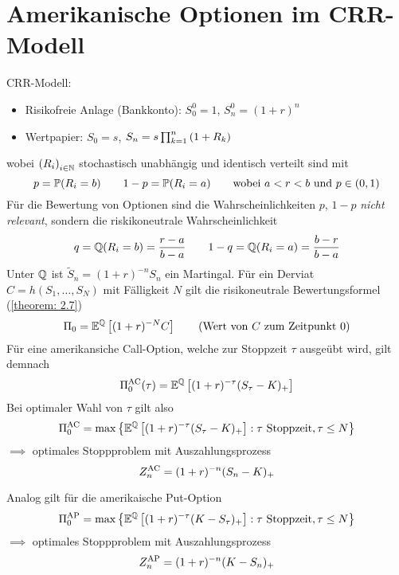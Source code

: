 \section{Amerikanische Optionen im CRR-Modell}

CRR-Modell:
\begin{itemize}
	\item Risikofreie Anlage (Bankkonto): $S_0^0 = 1$, $S_n^0 = (1+r)^n$
	\item Wertpapier:  $S_0 = s$, $S_n = s \prod_{k=1}^{n} \left( 1 + R_k \right)$
\end{itemize}
wobei $\left( R_i \right)_{i \in \mathbb{N}}$ stochastisch unabhängig und identisch verteilt sind mit
\begin{equation*}
	p = \mathbb{P}(R_i = b) \qquad 1-p = \mathbb{P}(R_i = a) \qquad \text{wobei } a < r < b \text{ und } p \in (0,1)
\end{equation*}
Für die Bewertung von Optionen sind die Wahrscheinlichkeiten $p$, $1-p$ \textit{nicht relevant}, sondern die riskikoneutrale Wahrscheinlichkeit 
\begin{equation*}
	q = \mathbb{Q}(R_i = b) = \frac{r-a}{b-a} \qquad 1-q = \mathbb{Q}(R_i = a) = \frac{b-r}{b-a}
\end{equation*}
Unter $\mathbb{Q}$ ist $\tilde{S}_n = (1+r)^{-n} S_n$ ein Martingal.
Für ein Derviat $C = h(S_1, \dots, S_N)$ mit Fälligkeit $N$ gilt die risikoneutrale Bewertungsformel (\cref{theorem: 2.7})
\begin{equation*}
	\Pi_0 = \mathbb{E}^{\mathbb{Q}}\left[ (1+r)^{-N} C \right]
	\tag{Wert von $C$ zum Zeitpunkt $0$}
\end{equation*}
Für eine amerikansiche Call-Option, welche zur Stoppzeit $\tau$ ausgeübt wird, gilt demnach
\begin{equation*}
	\Pi_0^{\operatorname{AC}}(\tau) = \mathbb{E}^{\mathbb{Q}} \left[ (1+r)^{-\tau} (S_\tau - K)_+ \right]
\end{equation*}
Bei optimaler Wahl von $\tau$ gilt also
\begin{equation*}
	\Pi_0^{\operatorname{AC}} = \max\left\{ \mathbb{E}^{\mathbb{Q}}\left[ (1+r)^{-\tau} (S_\tau - K)_+ \right] : \tau \text{ Stoppzeit}, \tau \le N \right\}
\end{equation*}
$\implies$ optimales Stoppproblem mit Auszahlungsprozess
\begin{equation*}
	Z_n^{\operatorname{AC}} = (1+r)^{-n} (S_n - K)_+
\end{equation*}

Analog gilt für die amerikaische Put-Option
\begin{equation*}
	\Pi_0^{\operatorname{AP}} = \max\left\{ \mathbb{E}^{\mathbb{Q}}\left[ (1+r)^{-\tau} (K - S_\tau)_+ \right] : \tau \text{ Stoppzeit}, \tau \le N \right\}
\end{equation*}
$\implies$ optimales Stoppproblem mit Auszahlungsprozess
\begin{equation*}
Z_n^{\operatorname{AP}} = (1+r)^{-n} (K - S_n)_+
\end{equation*}


